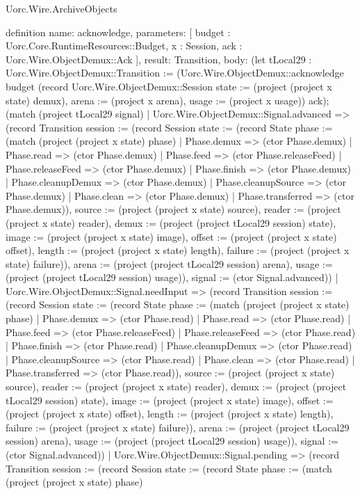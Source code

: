\begin{lexlean}{Uorc.Wire.ArchiveObjects}
\begin{semanticmodule}
definition{
  name: acknowledge,
  parameters: [
    budget : Uorc.Core.RuntimeResources::Budget,
    x : Session,
    ack : Uorc.Wire.ObjectDemux::Ack
  ],
  result: Transition,
  body: (let tLocal29 : Uorc.Wire.ObjectDemux::Transition := (Uorc.Wire.ObjectDemux::acknowledge budget (record Uorc.Wire.ObjectDemux::Session {state := (project (project x state) demux), arena := (project x arena), usage := (project x usage)}) ack); (match (project tLocal29 signal)
    | Uorc.Wire.ObjectDemux::Signal.advanced => (record Transition {session := (record Session {state := (record State {phase := (match (project (project x state) phase)
      | Phase.demux => (ctor Phase.demux)
      | Phase.read => (ctor Phase.demux)
      | Phase.feed => (ctor Phase.releaseFeed)
      | Phase.releaseFeed => (ctor Phase.demux)
      | Phase.finish => (ctor Phase.demux)
      | Phase.cleanupDemux => (ctor Phase.demux)
      | Phase.cleanupSource => (ctor Phase.demux)
      | Phase.clean => (ctor Phase.demux)
      | Phase.transferred => (ctor Phase.demux)), source := (project (project x state) source), reader := (project (project x state) reader), demux := (project (project tLocal29 session) state), image := (project (project x state) image), offset := (project (project x state) offset), length := (project (project x state) length), failure := (project (project x state) failure)}), arena := (project (project tLocal29 session) arena), usage := (project (project tLocal29 session) usage)}), signal := (ctor Signal.advanced)})
    | Uorc.Wire.ObjectDemux::Signal.needInput => (record Transition {session := (record Session {state := (record State {phase := (match (project (project x state) phase)
      | Phase.demux => (ctor Phase.read)
      | Phase.read => (ctor Phase.read)
      | Phase.feed => (ctor Phase.releaseFeed)
      | Phase.releaseFeed => (ctor Phase.read)
      | Phase.finish => (ctor Phase.read)
      | Phase.cleanupDemux => (ctor Phase.read)
      | Phase.cleanupSource => (ctor Phase.read)
      | Phase.clean => (ctor Phase.read)
      | Phase.transferred => (ctor Phase.read)), source := (project (project x state) source), reader := (project (project x state) reader), demux := (project (project tLocal29 session) state), image := (project (project x state) image), offset := (project (project x state) offset), length := (project (project x state) length), failure := (project (project x state) failure)}), arena := (project (project tLocal29 session) arena), usage := (project (project tLocal29 session) usage)}), signal := (ctor Signal.advanced)})
    | Uorc.Wire.ObjectDemux::Signal.pending => (record Transition {session := (record Session {state := (record State {phase := (match (project (project x state) phase)
}}}}
\end{semanticmodule}
\end{lexlean}
